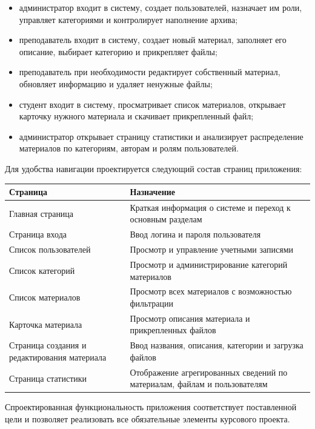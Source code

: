 \documentclass[14pt,a4paper]{extarticle}
\begin{document}
\begin{itemize}[leftmargin=1.25cm]
    \item администратор входит в систему, создает пользователей, назначает им роли, управляет категориями и контролирует наполнение архива;
    \item преподаватель входит в систему, создает новый материал, заполняет его описание, выбирает категорию и прикрепляет файлы;
    \item преподаватель при необходимости редактирует собственный материал, обновляет информацию и удаляет ненужные файлы;
    \item студент входит в систему, просматривает список материалов, открывает карточку нужного материала и скачивает прикрепленный файл;
    \item администратор открывает страницу статистики и анализирует распределение материалов по категориям, авторам и ролям пользователей.
\end{itemize}

Для удобства навигации проектируется следующий состав страниц приложения:

\begin{center}
\begin{tabularx}{0.96\textwidth}{>{\raggedright\arraybackslash}p{4.1cm} >{\raggedright\arraybackslash}X}
\toprule
\textbf{Страница} & \textbf{Назначение} \\
\midrule
Главная страница & Краткая информация о системе и переход к основным разделам \\
Страница входа & Ввод логина и пароля пользователя \\
Список пользователей & Просмотр и управление учетными записями \\
Список категорий & Просмотр и администрирование категорий материалов \\
Список материалов & Просмотр всех материалов с возможностью фильтрации \\
Карточка материала & Просмотр описания материала и прикрепленных файлов \\
Страница создания и редактирования материала & Ввод названия, описания, категории и загрузка файлов \\
Страница статистики & Отображение агрегированных сведений по материалам, файлам и пользователям \\
\bottomrule
\end{tabularx}
\end{center}

Спроектированная функциональность приложения соответствует поставленной цели и позволяет реализовать все обязательные элементы курсового проекта.
\end{document}
